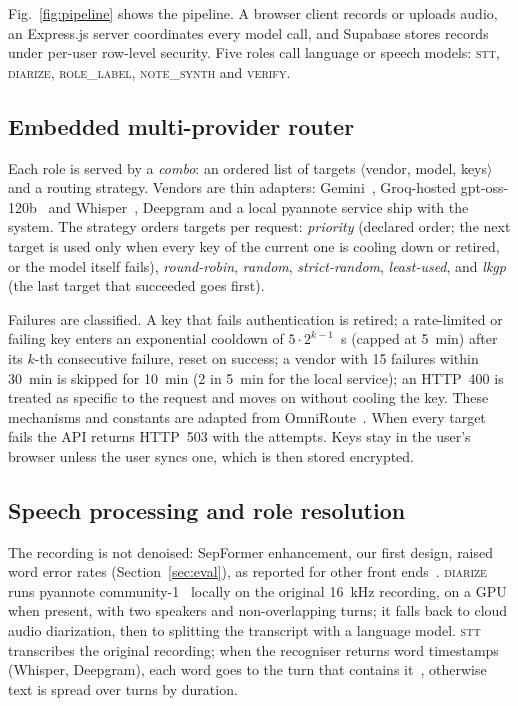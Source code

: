 \documentclass[conference]{IEEEtran}
\newcommand{\role}[1]{\textsc{\MakeLowercase{#1}}}
\begin{document}
Fig.~\ref{fig:pipeline} shows the pipeline. A browser client records or uploads audio, an Express.js server coordinates every model call, and Supabase stores records under per-user row-level security. Five roles call language or speech models: \role{STT}, \role{DIARIZE}, \role{ROLE\_LABEL}, \role{NOTE\_SYNTH} and \role{VERIFY}.

\subsection{Embedded multi-provider router}\label{sec:router}
Each role is served by a \emph{combo}: an ordered list of targets $\langle$vendor, model, keys$\rangle$ and a routing strategy. Vendors are thin adapters: Gemini~\cite{gemini2023}, Groq-hosted gpt-oss-120b~\cite{openai2025gptoss} and Whisper~\cite{radford2023whisper}, Deepgram and a local pyannote service ship with the system. The strategy orders targets per request: \emph{priority} (declared order; the next target is used only when every key of the current one is cooling down or retired, or the model itself fails), \emph{round-robin}, \emph{random}, \emph{strict-random}, \emph{least-used}, and \emph{lkgp} (the last target that succeeded goes first).

Failures are classified. A key that fails authentication is retired; a rate-limited or failing key enters an exponential cooldown of $5\cdot 2^{k-1}$~s (capped at 5~min) after its $k$-th consecutive failure, reset on success; a vendor with 15 failures within 30~min is skipped for 10~min (2 in 5~min for the local service); an HTTP~400 is treated as specific to the request and moves on without cooling the key. These mechanisms and constants are adapted from OmniRoute~\cite{omniroute2026}. When every target fails the API returns HTTP~503 with the attempts. Keys stay in the user's browser unless the user syncs one, which is then stored encrypted.

\subsection{Speech processing and role resolution}\label{sec:speech}
The recording is not denoised: SepFormer enhancement, our first design, raised word error rates (Section~\ref{sec:eval}), as reported for other front ends~\cite{iwamoto2022}. \role{DIARIZE} runs pyannote community-1~\cite{bredin2023pyannote,plaquet2023powerset} locally on the original 16~kHz recording, on a GPU when present, with two speakers and non-overlapping turns; it falls back to cloud audio diarization, then to splitting the transcript with a language model. \role{STT} transcribes the original recording; when the recogniser returns word timestamps (Whisper, Deepgram), each word goes to the turn that contains it~\cite{bain2023whisperx}, otherwise text is spread over turns by duration. 
\end{document}

